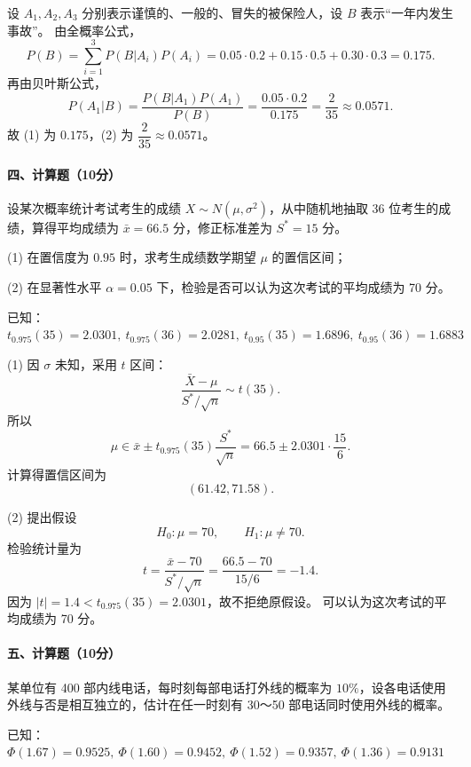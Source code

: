 \documentclass[lang=cn,11pt]{elegantbook}
\begin{document}
\begin{solution}
\par
设 \(A_1,A_2,A_3\) 分别表示谨慎的、一般的、冒失的被保险人，设 \(B\) 表示“一年内发生事故”。
由全概率公式，
\[
  P(B)=\sum_{i=1}^3 P(B|A_i)P(A_i)
  =0.05\cdot0.2+0.15\cdot0.5+0.30\cdot0.3=0.175.
\]
再由贝叶斯公式，
\[
  P(A_1|B)=\frac{P(B|A_1)P(A_1)}{P(B)}
  =\frac{0.05\cdot0.2}{0.175}
  =\frac{2}{35}\approx0.0571.
\]
故 (1) 为 \(0.175\)，(2) 为 \(\dfrac{2}{35}\approx0.0571\)。
\end{solution}

\paragraph*{四、计算题（10分）}
\begin{exercise}
\par
设某次概率统计考试考生的成绩 \(X\sim N(\mu,\sigma^2)\)，从中随机地抽取 36 位考生的成绩，算得平均成绩为 \(\bar{x}=66.5\) 分，修正标准差为 \(S^*=15\) 分。

(1) 在置信度为 \(0.95\) 时，求考生成绩数学期望 \(\mu\) 的置信区间；

(2) 在显著性水平 \(\alpha=0.05\) 下，检验是否可以认为这次考试的平均成绩为 70 分。

已知：\(t_{0.975}(35)=2.0301,\ t_{0.975}(36)=2.0281,\ t_{0.95}(35)=1.6896,\ t_{0.95}(36)=1.6883\)
\end{exercise}

\begin{solution}
\par
(1) 因 \(\sigma\) 未知，采用 \(t\) 区间：
\[
  \frac{\bar{X}-\mu}{S^*/\sqrt{n}}\sim t(35).
\]
所以
\[
  \mu\in \bar{x}\pm t_{0.975}(35)\frac{S^*}{\sqrt{n}}
  =66.5\pm2.0301\cdot\frac{15}{6}.
\]
计算得置信区间为
\[
  (61.42,71.58).
\]

(2) 提出假设
\[
  H_0:\mu=70,\qquad H_1:\mu\ne70.
\]
检验统计量为
\[
  t=\frac{\bar{x}-70}{S^*/\sqrt{n}}
  =\frac{66.5-70}{15/6}=-1.4.
\]
因为 \(|t|=1.4<t_{0.975}(35)=2.0301\)，故不拒绝原假设。
可以认为这次考试的平均成绩为 70 分。
\end{solution}

\paragraph*{五、计算题（10分）}
\begin{exercise}
\par
某单位有 400 部内线电话，每时刻每部电话打外线的概率为 \(10\%\)，设各电话使用外线与否是相互独立的，估计在任一时刻有 30～50 部电话同时使用外线的概率。

已知：\(\Phi(1.67)=0.9525,\ \Phi(1.60)=0.9452,\ \Phi(1.52)=0.9357,\ \Phi(1.36)=0.9131\)
\end{exercise}
\end{document}
